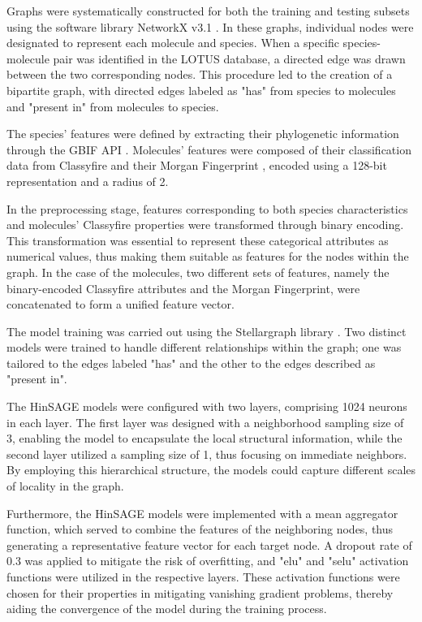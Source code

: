 \documentclass[
11pt, %
oneside, %
english, %
singlespacing, %
headsepline, %
chapterinoneline, %
]{MastersDoctoralThesis} %
\begin{document}
Graphs were systematically constructed for both the training and testing subsets using the software library NetworkX v3.1 \cite{SciPyProceedings_11}. In these graphs, individual nodes were designated to represent each molecule and species. When a specific species-molecule pair was identified in the LOTUS database, a directed edge was drawn between the two corresponding nodes. This procedure led to the creation of a bipartite graph, with directed edges labeled as "has" from species to molecules and "present in" from molecules to species.

The species' features were defined by extracting their phylogenetic information through the GBIF API \cite{GBIF, GbifPygbif2023}. Molecules' features were composed of their classification data from Classyfire \cite{djoumboufeunangClassyFireAutomatedChemical2016} and their Morgan Fingerprint \cite{rogersExtendedConnectivityFingerprints2010}, encoded using a 128-bit representation and a radius of 2.

In the preprocessing stage, features corresponding to both species characteristics and molecules' Classyfire properties were transformed through binary encoding. This transformation was essential to represent these categorical attributes as numerical values, thus making them suitable as features for the nodes within the graph. In the case of the molecules, two different sets of features, namely the binary-encoded Classyfire attributes and the Morgan Fingerprint, were concatenated to form a unified feature vector.

The model training was carried out using the Stellargraph library \cite{StellarGraphMachineLearning2018}. Two distinct models were trained to handle different relationships within the graph; one was tailored to the edges labeled "has" and the other to the edges described as "present in".

The HinSAGE models were configured with two layers, comprising 1024 neurons in each layer. The first layer was designed with a neighborhood sampling size of 3, enabling the model to encapsulate the local structural information, while the second layer utilized a sampling size of 1, thus focusing on immediate neighbors. By employing this hierarchical structure, the models could capture different scales of locality in the graph.

Furthermore, the HinSAGE models were implemented with a mean aggregator function, which served to combine the features of the neighboring nodes, thus generating a representative feature vector for each target node. A dropout rate of 0.3 was applied to mitigate the risk of overfitting, and "elu" and "selu" activation functions were utilized in the respective layers. These activation functions were chosen for their properties in mitigating vanishing gradient problems, thereby aiding the convergence of the model during the training process.
\end{document}
